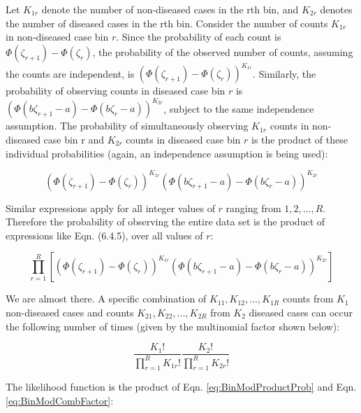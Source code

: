 \documentclass[
]{book}
\begin{document}
Let \(K_{1r}\) denote the number of non-diseased cases in the rth bin, and \(K_{2r}\) denotes the number of diseased cases in the rth bin. Consider the number of counts \(K_{1r}\) in non-diseased case bin \(r\). Since the probability of each count is \(\Phi\left ( \zeta_{r+1} \right ) - \Phi\left ( \zeta_r \right )\), the probability of the observed number of counts, assuming the counts are independent, is \({\left(\Phi\left ( \zeta_{r+1} \right ) - \Phi\left ( \zeta_r \right ) \right )}^{K_{1r}}\). Similarly, the probability of observing counts in diseased case bin \(r\) is \({\left (\Phi\left ( b\zeta_{r+1}-a \right ) - \Phi\left ( b\zeta_r-a \right ) \right )}^{K_{2r}}\), subject to the same independence assumption. The probability of simultaneously observing \(K_{1r}\) counts in non-diseased case bin r and \(K_{2r}\) counts in diseased case bin \(r\) is the product of these individual probabilities (again, an independence assumption is being used):

\begin{equation*} 
\left (\Phi\left ( \zeta_{r+1}  \right ) - \Phi\left ( \zeta_r  \right )  \right )^{K_{1r}} \left (\Phi\left ( b\zeta_{r+1}-a  \right ) - \Phi\left ( b\zeta_r-a  \right )  \right )^{K_{2r}}
\end{equation*}

Similar expressions apply for all integer values of \(r\) ranging from \(1,2,...,R\). Therefore the probability of observing the entire data set is the product of expressions like Eqn. (6.4.5), over all values of \(r\):

\begin{equation} 
\prod_{r=1}^{R}\left [\left (\Phi\left ( \zeta_{r+1}  \right ) - \Phi\left ( \zeta_r  \right )  \right )^{K_{1r}} \left (\Phi\left ( b\zeta_{r+1}-a  \right ) - \Phi\left ( b\zeta_r-a  \right )  \right )^{K_{2r}}  \right ]
\label{eq:BinModProductProb}
\end{equation}

We are almost there. A specific combination of \(K_{11},K_{12},...,K_{1R}\) counts from \(K_1\) non-diseased cases and counts \(K_{21},K_{22},...,K_{2R}\) from \(K_2\) diseased cases can occur the following number of times (given by the multinomial factor shown below):

\begin{equation} 
\frac{K_1!}{\prod_{r=1}^{R}K_{1r}!}\frac{K_2!}{\prod_{r=1}^{R}K_{2r}!}
\label{eq:BinModCombFactor}
\end{equation}

The likelihood function is the product of Eqn. \eqref{eq:BinModProductProb} and Eqn. \eqref{eq:BinModCombFactor}:
\end{document}

